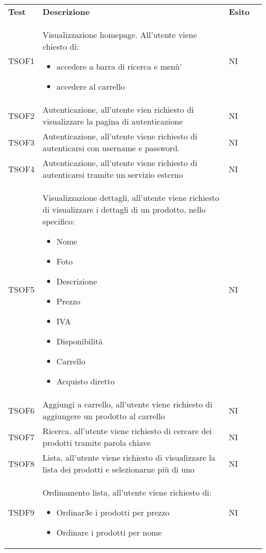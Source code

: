 \begin{center}
    \centering
    \renewcommand{\arraystretch}{1.8}
    \label{tab:TestAccettazione}
    \begin{longtable}[!h]{p{50px} p{245px} p{75px} p{50px}}
        \rowcolor{logo!70} \textbf{Test} & \textbf{Descrizione} & \textbf{Esito} \\
        TSOF1   & Visualizzazione homepage. All'utente viene chiesto di: \begin{itemize} \item accedere a barra di ricerca e men\`u' \item accedere al carrello \end{itemize} & NI \\
        TSOF2   & Autenticazione, all'utente vien richiesto di visualizzare la pagina di autenticazione & NI \\
        TSOF3   & Autenticazione, all'utente viene richiesto di autenticarsi con username e password. & NI \\
        TSOF4   & Autenticazione, all'utente viene richiesto di autenticarsi tramite un servizio esterno & NI \\
        TSOF5   & Visualizzazione dettagli, all'utente viene richiesto di visualizzare i dettagli di un prodotto, nello specifico: \begin{itemize} \item Nome \item Foto \item Descrizione \item Prezzo\item IVA \item Disponibilit\`a \item Carrello \item Acquisto diretto \end{itemize} & NI \\
        TSOF6   & Aggiungi a carrello, all'utente viene richiesto di aggiungere un prodotto al carrello & NI \\
        TSOF7   & Ricerca, all'utente viene richiesto di cercare dei prodotti tramite parola chiave & NI \\
        TSOF8   & Lista, all'utente viene richiesto di visualizzare la lista dei prodotti e selezionarne pi\`u di uno & NI \\
        TSDF9   & Ordinamento lista, all'utente viene richiesto di: \begin{itemize} \item Ordinar3e i prodotti per prezzo \item Ordinare i prodotti per nome \end{itemize}& NI \\

\end{longtable}
\end{center}
